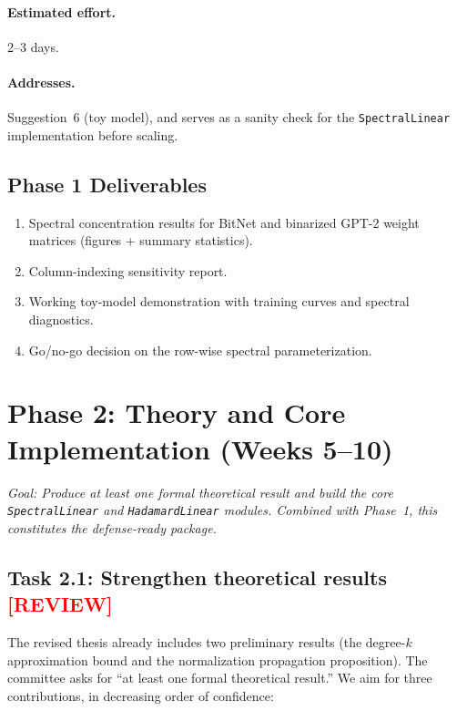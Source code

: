\documentclass[12pt,a4paper]{article}
\newcommand{\review}{\texorpdfstring{\textcolor{red}{\textbf{[REVIEW]}}}{[REVIEW]}}
\begin{document}
\paragraph{Estimated effort.} 2--3 days.

\paragraph{Addresses.} Suggestion~6 (toy model), and serves as a sanity check for the \texttt{SpectralLinear} implementation before scaling.

\subsection{Phase 1 Deliverables}

\begin{enumerate}
    \item Spectral concentration results for BitNet and binarized GPT-2 weight matrices (figures + summary statistics).
    \item Column-indexing sensitivity report.
    \item Working toy-model demonstration with training curves and spectral diagnostics.
    \item Go/no-go decision on the row-wise spectral parameterization.
\end{enumerate}


\section{Phase 2: Theory and Core Implementation (Weeks 5--10)}\label{sec:phase2}

\textit{Goal: Produce at least one formal theoretical result and build the core \texttt{SpectralLinear} and \texttt{HadamardLinear} modules. Combined with Phase~1, this constitutes the defense-ready package.}

\subsection{Task 2.1: Strengthen theoretical results \review}

The revised thesis already includes two preliminary results (the degree-$k$ approximation bound and the normalization propagation proposition). The committee asks for ``at least one formal theoretical result.'' We aim for three contributions, in decreasing order of confidence:
\end{document}
